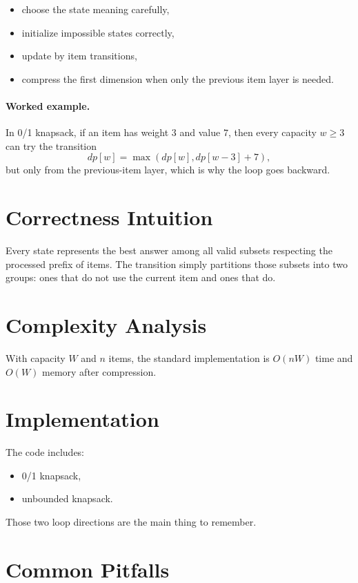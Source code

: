 \begin{itemize}
  \item choose the state meaning carefully,
  \item initialize impossible states correctly,
  \item update by item transitions,
  \item compress the first dimension when only the previous item layer is needed.
\end{itemize}

\paragraph{Worked example.}
In 0/1 knapsack, if an item has weight \(3\) and value \(7\), then every capacity \(w \ge 3\) can try the transition
\[
dp[w] = \max(dp[w], dp[w - 3] + 7),
\]
but only from the previous-item layer, which is why the loop goes backward.

\section*{Correctness Intuition}

Every state represents the best answer among all valid subsets respecting the processed prefix of items. The transition
simply partitions those subsets into two groups: ones that do not use the current item and ones that do.

\section*{Complexity Analysis}

With capacity \(W\) and \(n\) items, the standard implementation is \(O(nW)\) time and \(O(W)\) memory after
compression.

\section*{Implementation}

The code includes:

\begin{itemize}
  \item 0/1 knapsack,
  \item unbounded knapsack.
\end{itemize}

Those two loop directions are the main thing to remember.

\section*{Common Pitfalls}

